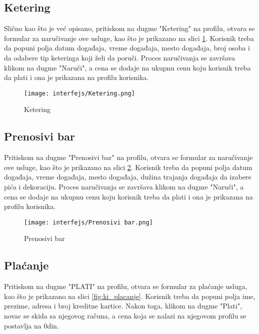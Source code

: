 \documentclass[a4paper]{article}
\begin{document}
\subsection{Ketering}

Slično kao što je već opisano, pritiskom na dugme "Ketering" na profilu, otvara se formular za naručivanje ove usluge, kao što je prikazano na slici \ref{fig:ki_ketering}. Korisnik treba da popuni polja datum događaja, vreme događaja, mesto događaja, broj osoba i da odabere tip keteringa koji želi da poruči. Proces naručivanja se završava klikom na dugme "Naruči", a cena se dodaje na ukupnu cenu koju korisnik treba da plati i ona je prikazana na profilu korisnika.  

\begin{figure}[H]
    \centering
    \texttt{[image: interfejs/Ketering.png]}
    \caption{Ketering}
    \label{fig:ki_ketering}
\end{figure}

\subsection{Prenosivi bar}

Pritiskom na dugme "Prenosivi bar" na profilu, otvara se formular za naručivanje ove usluge, kao što je prikazano na slici \ref{fig:ki_prenosivibar}. Korisnik treba da popuni polja datum događaja, vreme događaja, mesto događaja, dužina trajanja događaja da izabere pića i dekoraciju. Proces naručivanja se završava klikom na dugme "Naruči", a cena se dodaje na ukupnu cenu koju korisnik treba da plati i ona je prikazana na profilu korisnika.  

\begin{figure}[H]
    \centering
    \texttt{[image: interfejs/Prenosivi bar.png]}
    \caption{Prenosivi bar}
    \label{fig:ki_prenosivibar}
\end{figure}

\subsection{Plaćanje}

Pritiskom na dugme "PLATI" na profilu, otvara se formular za plaćanje usluga, kao što je prikazano na slici \ref{fig:ki_placanje}. Korisnik treba da popuni polja ime, prezime, adresa i broj kreditne kartice. Nakon toga, klikom na dugme "Plati", novac se skida sa njegovog računa, a cena koja se nalazi na njegovom profilu se postavlja na 0din.  
\end{document}
